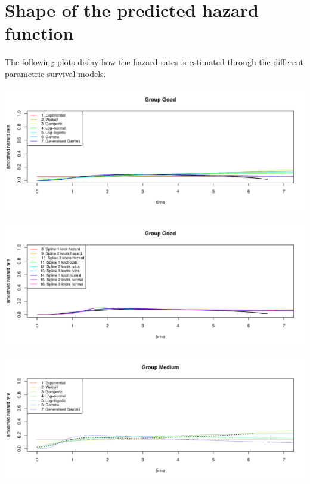 \documentclass[]{article}
\begin{document}
\newpage

\section{Shape of the predicted hazard
function}\label{shape-of-the-predicted-hazard-function}

The following plots dislay how the hazard rates is estimated through the
different parametric survival models.

\begin{flushleft}\includegraphics[height=0.29\textheight]{Images/plot_haz_pred-1} \end{flushleft}

\begin{flushleft}\includegraphics[height=0.29\textheight]{Images/plot_haz_pred-2} \end{flushleft}

\begin{flushleft}\includegraphics[height=0.29\textheight]{Images/plot_haz_pred-3} \end{flushleft}
\end{document}
